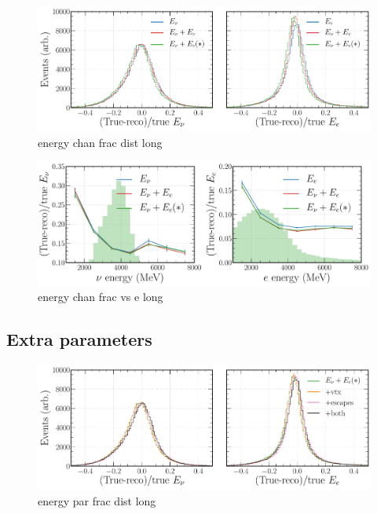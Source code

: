 \begin{figure} %
    \includegraphics[width=\textwidth]{diagrams/6-cvn/chipsnet/energy_chan_frac_dist.pdf}
    \caption[energy chan frac dist short]
    {energy chan frac dist long}
    \label{fig:energy_chan_frac_dist}
\end{figure}

\begin{figure} %
    \includegraphics[width=\textwidth]{diagrams/6-cvn/chipsnet/energy_chan_frac_vs_e.pdf}
    \caption[energy chan frac vs e short]
    {energy chan frac vs e long}
    \label{fig:energy_chan_frac_vs_e}
\end{figure}

\subsection{Extra parameters} %
\label{sec:cvn_energy_par} %

\begin{figure} %
    \includegraphics[width=\textwidth]{diagrams/6-cvn/chipsnet/energy_par_frac_dist.pdf}
    \caption[energy par frac dist short]
    {energy par frac dist long}
    \label{fig:energy_par_frac_dist}
\end{figure}

